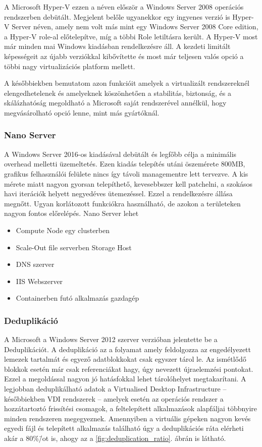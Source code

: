 \documentclass[12pt,oneside,justify,table]{book}
\begin{document}
A Microsoft Hyper-V ezzen a néven először a Windows Server 2008 operációs rendszerben debütált. 
Megjelent belőle ugyanekkor egy ingyenes verzió is Hyper-V Server néven, amely nem volt más mint egy Windows Server 2008 Core edition, a Hyper-V role-al előtelepítve, míg a többi Role letiltásra került.
A Hyper-V most már minden mai Windows kiadásban rendelkezésre áll. A kezdeti limitált képességeit az újabb verziókkal kibővítette és most már teljesen valós opció a többi nagy virtualizációs platform mellett. 

A későbbiekben bemutatom azon funkcióit amelyek a virtualizált rendszereknél elengedhetelenek és amelyeknek köszönhetően a stabilitás, biztonság, és a skálázhatóság megoldható a Microsoft saját rendszerével annélkül, hogy megvásárolható opció lenne, mint más gyártóknál.

\subsubsection{Nano Server}

A Windows Server 2016-os kiadásával debütált és legfőbb célja a minimális overhead melletti üzemeltetés. 
Ezen kiadás telepítés utáni öszemérete 800MB, grafikus felhasználói felülete nincs így távoli managementre lett tervezve.
A kis mérete miatt nagyon gyorsan telepíthető, kevesebbszer kell patchelni, a szokásos havi iterációk helyett negyedéves ütemezéssel. 
Ezzel a rendelkezésre állása megnőtt. 
Ugyan korlátozott funkciókra használható, de azokon a területeken nagyon fontos előrelépés. 
Nano Server lehet 
\begin{itemize}
	\item Compute Node egy clusterben
	\item Scale-Out file serverben Storage Host
	\item DNS szerver
	\item IIS Webszerver
	\item Containerben futó alkalmazás gazdagép
\end{itemize}

\subsubsection{Deduplikáció}

A Microsoft a Windows Server 2012 szerver verzióban jelentette be a Deduplikációt. 
A deduplikáció az a folyamat amely feldolgozza az engedélyezett lemezek tartalmát és egyező adatblokkokat csak egyszer tárol le. Az ismétlődő blokkok esetén már csak referenciákat hagy, úgy nevezett újraelemzési pontokat. 
Ezzel a megoldással nagyon jó hatásfokkal lehet tárolóhelyet megtakarítani. 
A legjobban deduplikálható adatok a Virtualised Desktop Infrastructure -- későbbiekben VDI rendszerek -- amelyek esetén az operációs rendszer a hozzátartoztó frissítési csomagok, a feltelepített alkalmazások alapfáljai többnyire minden rendszeren megegyeznek. 
Amennyiben a virtuális gépeken nagyon kevés egyedi fájl és telepített alkalmazás található úgy a deduplikációs ráta elérheti akár a 80\%\=/ot is, ahogy az a \ref{fig:deduplication_ratio}. ábrán is látható.
\end{document}
